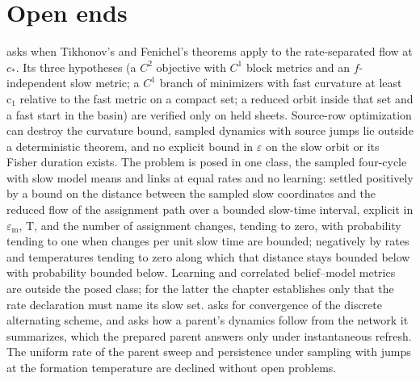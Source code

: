 \section{Open ends}
\label{comp:ch08-open}

 asks when Tikhonov's and Fenichel's theorems apply to the rate-separated
flow at $c_*$. Its three hypotheses (a $C^2$ objective with $C^1$ block metrics and an
$f$-independent slow metric; a $C^1$ branch of minimizers with fast curvature at least $\mathrm c_1$
relative to the fast metric on a compact set; a reduced orbit inside that set and a fast start in the
basin) are verified only on held sheets. Source-row optimization can destroy the curvature bound,
sampled dynamics with source jumps lie outside a deterministic theorem, and no explicit bound in
$\varepsilon$ on the slow orbit or its Fisher duration exists. The problem is posed in one class, the
sampled four-cycle with slow model means and links at equal rates and no learning: settled positively
by a bound on the distance between the sampled slow coordinates and the reduced flow of the assignment
path over a bounded slow-time interval, explicit in $\varepsilon_{\mathrm m}$, $\mathrm T$, and the
number of assignment changes, tending to zero, with probability tending to one when changes per unit
slow time are bounded; negatively by rates and temperatures tending to zero along which that distance
stays bounded below with probability bounded below. Learning and correlated belief--model metrics are
outside the posed class; for the latter the chapter establishes only that the rate declaration must
name its slow set.  asks for convergence of the discrete
alternating scheme, and  asks how a parent's dynamics follow
from the network it summarizes, which the prepared parent answers only under instantaneous refresh.
The uniform rate of the parent sweep and persistence under sampling with jumps at the formation
temperature are declined without open problems.

